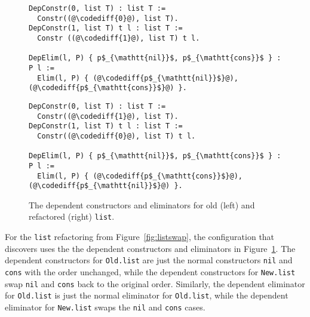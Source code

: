 \begin{figure}
\begin{minipage}{0.48\textwidth}
\begin{lstlisting}
DepConstr(0, list T) : list T :=
  Constr((@\codediff{0}@), list T).
DepConstr(1, list T) t l : list T :=
  Constr ((@\codediff{1}@), list T) t l.

DepElim(l, P) { p$_{\mathtt{nil}}$, p$_{\mathtt{cons}}$ } : P l :=
  Elim(l, P) { (@\codediff{p$_{\mathtt{nil}}$}@), (@\codediff{p$_{\mathtt{cons}}$}@) }.
\end{lstlisting}
\end{minipage}
\hfill
\begin{minipage}{0.48\textwidth}
\begin{lstlisting}
DepConstr(0, list T) : list T :=
  Constr((@\codediff{1}@), list T).
DepConstr(1, list T) t l : list T :=
  Constr((@\codediff{0}@), list T) t l.

DepElim(l, P) { p$_{\mathtt{nil}}$, p$_{\mathtt{cons}}$ } : P l :=
  Elim(l, P) { (@\codediff{p$_{\mathtt{cons}}$}@), (@\codediff{p$_{\mathtt{nil}}$}@) }.
\end{lstlisting}
\end{minipage}
\caption{The dependent constructors and eliminators for old (left) and refactored (right) \lstinline{list}.}
\label{fig:listconfig}
\end{figure}

For the \lstinline{list} refactoring from Figure~\ref{fig:listswap},
the configuration that \toolname discovers uses the the dependent constructors
and eliminators in Figure~\ref{fig:listconfig}. The dependent constructors for \lstinline{Old.list}
are just the normal constructors \lstinline{nil} and \lstinline{cons} with the order unchanged,
while the dependent constructors for \lstinline{New.list} swap \lstinline{nil} and \lstinline{cons}
back to the original order.
Similarly, the dependent eliminator for \lstinline{Old.list} is just the normal eliminator for \lstinline{Old.list},
while the dependent eliminator for \lstinline{New.list} swaps the \lstinline{nil} and \lstinline{cons} cases.

